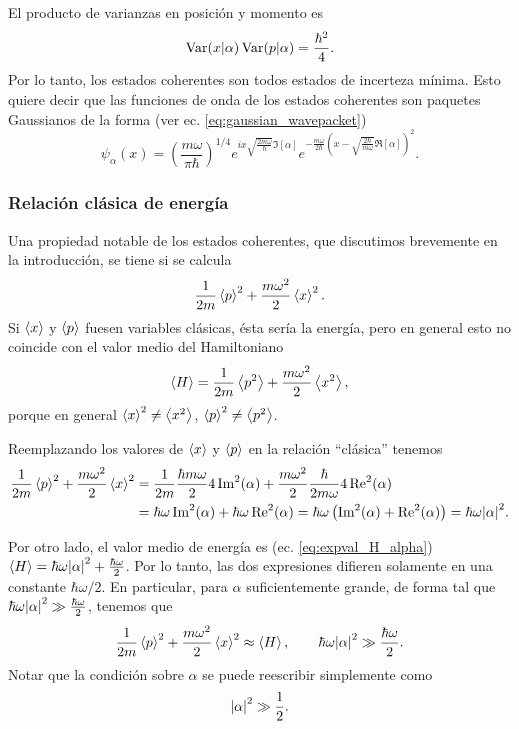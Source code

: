 \documentclass[10pt, a4paper]{article}
\newcommand{\xprefactsq}{\frac{\hbar}{2m\omega}}
\newcommand{\pprefactsq}{\frac{\hbar m \omega}{2}}
\numberwithin{equation}{subsection}
\begin{document}
\bigbreak

El producto de varianzas en posición y momento es
\begin{equation}
  \Var(x\vert\alpha) \Var(p\vert\alpha) = \frac{\hbar^2}{4}.
\end{equation}
Por lo tanto, los estados coherentes son todos estados de incerteza mínima.
Esto quiere decir que las funciones de onda de los estados coherentes son
paquetes Gaussianos de la forma (ver ec. \eqref{eq:gaussian_wavepacket})
\begin{equation}
  \psi_{\alpha}(x) = \left(\frac{m\omega}{\pi\hbar}\right)^{1/4}
    e^{ix\sqrt{\frac{2m\omega}{\hbar}}\Im\left[\alpha\right]}
    e^{ -\frac{m\omega}{2\hbar} \left(x - \sqrt{\frac{2\hbar}{m\omega}}
    \Re\left[\alpha\right]\right)^2}.
\end{equation}

\subsubsection{Relación clásica de energía}

Una propiedad notable de los estados coherentes, que discutimos brevemente en
la introducción, se tiene si se calcula
\begin{equation}
  \frac{1}{2m}\expval{p}^2 + \frac{m\omega^2}{2}\expval{x}^2.
\end{equation}
Si $\expval{x}$ y $\expval{p}$ fuesen variables clásicas, ésta sería la
energía, pero en general esto no coincide con el valor medio del Hamiltoniano
\begin{equation}
  \expval{H} = \frac{1}{2m}\expval{p^2} + \frac{m\omega^2}{2}\expval{x^2},
\end{equation}
porque en general $\expval{x}^2 \neq \expval{x^2}$, $\expval{p}^2 \neq
\expval{p^2}$.

Reemplazando los valores de $\expval{x}$ y $\expval{p}$ en la relación
``clásica'' tenemos
\begin{align}
  \frac{1}{2m}\expval{p}^2 + \frac{m\omega^2}{2}\expval{x}^2 &=
    \frac{1}{2m}\pprefactsq 4\Im^2(\alpha) + \frac{m\omega^2}{2}\xprefactsq
    4\Re^2(\alpha) \nonumber \\
  &= \hbar\omega\Im^2(\alpha) + \hbar\omega\Re^2(\alpha)
    = \hbar\omega\left(\Im^2(\alpha) + \Re^2(\alpha)\right)
    = \hbar\omega\abs{\alpha}^2.
\end{align}

Por otro lado, el valor medio de energía es (ec. \eqref{eq:expval_H_alpha})
$\expval{H} = \hbar\omega\abs{\alpha}^2 + \frac{\hbar\omega}{2}$. Por lo tanto,
las dos expresiones difieren solamente en una constante $\hbar\omega/2$. En
particular, para $\alpha$ suficientemente grande, de forma tal que
$\hbar\omega\abs{\alpha}^2 \gg \frac{\hbar\omega}{2}$, tenemos que
\begin{equation}
  \frac{1}{2m}\expval{p}^2 + \frac{m\omega^2}{2}\expval{x}^2 \approx
  \expval{H}, \qquad \hbar\omega\abs{\alpha}^2 \gg \frac{\hbar\omega}{2}.
\end{equation}
Notar que la condición sobre $\alpha$ se puede reescribir simplemente como
\begin{equation}
  \abs{\alpha}^2 \gg \frac{1}{2}.
\end{equation}
\end{document}
